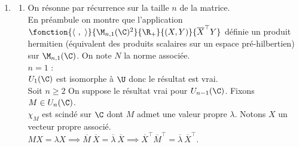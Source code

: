 \documentclass{book}
\begin{document}
\begin{enumerate}[leftmargin=*]
		Or si $M\in \mathcal{Z}$ alors en posant pour tout $k\in \N^*,\ M_k=M-\displaystyle\frac{1}{k}I_n$ on a :
		\begin{itemize}
			\item $(M_k)_{k\in \N^*}$ converge vers $M$
			\item APCR $M_k\notin \mathcal{Z}$ puisque sinon il existerait une infinité de $k\in \N^*$ pour lequel $\det(M_k)\ne 0$. Pour chacun de ces $k$ on aurait $\displaystyle\frac{1}{k}\in \operatorname{Sp}(M)$ et donc $M$ aurait une infinité de valeurs propres.
		\end{itemize}
		Ainsi, aucune matrice de $\mathcal{Z}$ n'est intérieure à $\mathcal{Z}$.\\
		Finalement, $\widering{U_n(\C)}\subset \ring{\mathcal{Z}}=\emptyset$ est vide.\\\\
		Pour $SU_n(\C)$ on remarque que $SU_n(\C)=U_n(\C)\cap \text{SL}_n(\C)$ où SL$_n(\C)$ désigne l'ensemble des matrices complexes dont le déterminant vaut $1$.\\
		SL$_n(\C)=\ker(\det)$ c'est donc un sous-groupe de GL$_n(\C)$ et donc $SU_n(\C)$ est un sous-groupe de GL$_n(\C)$.\\
		De plus comme l'application $\det$ est continue on obtient aussi que SL$_n(\C)$ est fermé et donc que $SU_n(\C)$ est compact en tant que fermé inclus dans un compact ($U_n(\C)$).\\
		Enfin $SU_n(\C)\subset U_n(\C)\implies \widering{SU_n(\C)}=\emptyset$.
		\item \begin{enumerate}[label=\alph*.]
			\item On résonne par récurrence sur la taille $n$ de la matrice.\\
			En préambule on montre que l'application $\fonction{\langle\ ,\ \rangle}{\M_{n,1}(\C)^2}{\R_+}{(X,Y)}{\overline{X}^\top Y}$ définie un produit hermitien (équivalent des produits scalaires sur un espace pré-hilbertien) sur $\M_{n,1}(\C)$. On note $N$ la norme associée.\\
			$n=1$ :\\
			$U_1(\C)$ est isomorphe à $\U$ donc le résultat est vrai.\\
			Soit $n\geq 2$ On suppose le résultat vrai pour $U_{n-1}(\C)$. Fixons $M\in U_n(\C)$.\\
			$\chi_M$ est scindé sur $\C$ dont $M$ admet une valeur propre $\lambda$. Notons $X$ un vecteur propre associé.\\
			$MX=\lambda X\implies \overline{M}\ \overline{X}=\overline{\lambda}\ \overline{X}\implies \overline{X}^\top\overline{M}^\top=\overline{\lambda}\ \overline{X}^\top$.\\

\end{enumerate}
\end{enumerate}
\end{document}
